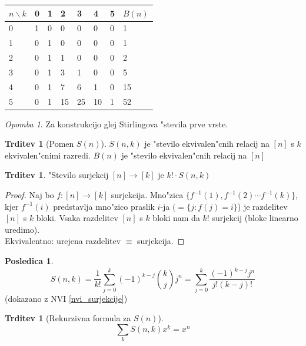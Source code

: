 \documentclass[a4paper,12pt]{article}
\theoremstyle{definition}
\newtheorem{conseq}[counter]{Posledica}
\newtheorem{claim}[counter]{Trditev}
\theoremstyle{remark}
\newtheorem*{rem}{Opomba}
\begin{document}
\begin{center}
	\begin{tabular}{l|llllll|l}
	    $n \backslash k$ & 0 & 1  & 2  & 3  & 4  & 5 & $B(n)$ \\
	    \hline
	    0 & 1 & 0  & 0  & 0  & 0  & 0 & 1 \\
	    1 & 0 & 1  & 0  & 0  & 0  & 0 & 1 \\
	    2 & 0 & 1  & 1  & 0  & 0  & 0 & 2 \\
	    3 & 0 & 1  & 3  & 1  & 0  & 0 & 5 \\
	    4 & 0 & 1  & 7  & 6  & 1  & 0 & 15 \\
	    5 & 0 & 1  & 15 & 25 & 10 & 1 & 52
	\end{tabular}
\end{center}

\begin{rem}
	Za konstrukcijo glej Stirlingova "stevila prve vrste.
\end{rem}

\begin{claim}[Pomen $S(n)$]
    $S(n,k)$ je "stevilo ekvivalen"cnih relacij na $[n]$ s $k$ ekvivalen"cnimi razredi. $B(n)$ je "stevilo ekvivalen"cnih relacij na $[n]$
\end{claim}

\begin{claim}
    "Stevilo surjekcij $[n] \rightarrow [k]$ je $k! \cdot S(n,k)$
\end{claim}

\begin{proof}
    Naj bo $f: [n] \rightarrow [k]$ surjekcija.
    Mno"zica $\{f^{-1}(1), f^{-1}(2) \cdots f^{-1}(k)\}$, kjer $f^{-1}(i)$ predstavlja mno"zico praslik $i$-ja $(=\{j: f(j) = i\}$) je razdelitev $[n]$ s $k$ bloki. Vsaka razdelitev $[n]$ s $k$ bloki nam da $k!$ surjekcij
    (bloke linearno uredimo).
    \\
    Ekvivalentno: urejena razdelitev $\equiv$ surjekcija.
\end{proof}

\begin{conseq}
	\[S(n,k) = \frac{1}{k!} \sum_{j=0}^k (-1)^{k-j} \binom{k}{j}j^n = \sum_{j=0}^k \frac{(-1)^{k-j} j^n}{j! (k-j)!}\]
	(dokazano z NVI \ref{nvi_surjekcije})
\end{conseq}


\begin{claim}[Rekurzivna formula za $S(n)$]
    \[\sum_k S(n,k)x^{\underline{k}} = x^n\]
\end{claim}
\end{document}
